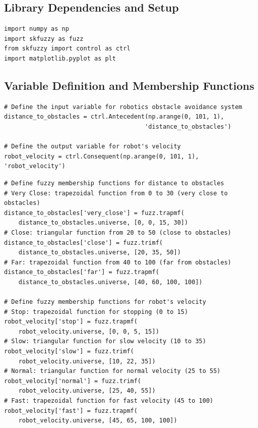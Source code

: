\documentclass[11pt,a4paper]{article}
\begin{document}
\subsection{Library Dependencies and Setup}

\begin{lstlisting}[caption=Required Libraries and Imports]
import numpy as np
import skfuzzy as fuzz
from skfuzzy import control as ctrl
import matplotlib.pyplot as plt
\end{lstlisting}

\subsection{Variable Definition and Membership Functions}

\begin{lstlisting}[caption=Input and Output Variable Definition]
# Define the input variable for robotics obstacle avoidance system
distance_to_obstacles = ctrl.Antecedent(np.arange(0, 101, 1), 
                                       'distance_to_obstacles')

# Define the output variable for robot's velocity
robot_velocity = ctrl.Consequent(np.arange(0, 101, 1), 'robot_velocity')
\end{lstlisting}

\begin{lstlisting}[caption=Membership Function Definition]
# Define fuzzy membership functions for distance to obstacles
# Very Close: trapezoidal function from 0 to 30 (very close to obstacles)
distance_to_obstacles['very_close'] = fuzz.trapmf(
    distance_to_obstacles.universe, [0, 0, 15, 30])
# Close: triangular function from 20 to 50 (close to obstacles)
distance_to_obstacles['close'] = fuzz.trimf(
    distance_to_obstacles.universe, [20, 35, 50])
# Far: trapezoidal function from 40 to 100 (far from obstacles)
distance_to_obstacles['far'] = fuzz.trapmf(
    distance_to_obstacles.universe, [40, 60, 100, 100])

# Define fuzzy membership functions for robot's velocity
# Stop: trapezoidal function for stopping (0 to 15)
robot_velocity['stop'] = fuzz.trapmf(
    robot_velocity.universe, [0, 0, 5, 15])
# Slow: triangular function for slow velocity (10 to 35)
robot_velocity['slow'] = fuzz.trimf(
    robot_velocity.universe, [10, 22, 35])
# Normal: triangular function for normal velocity (25 to 55)
robot_velocity['normal'] = fuzz.trimf(
    robot_velocity.universe, [25, 40, 55])
# Fast: trapezoidal function for fast velocity (45 to 100)
robot_velocity['fast'] = fuzz.trapmf(
    robot_velocity.universe, [45, 65, 100, 100])
\end{lstlisting}
\end{document}
